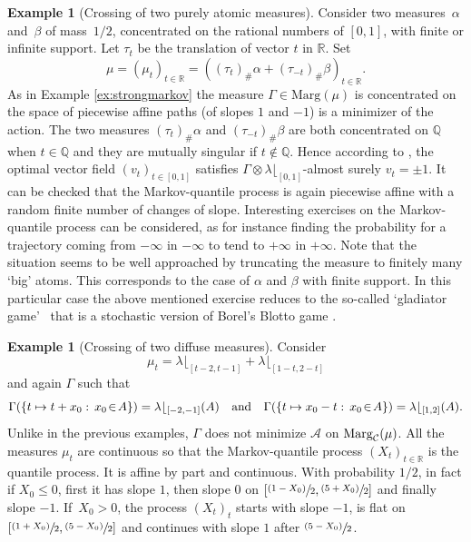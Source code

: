 \documentclass[11pt]{article}
\newcommand\mto{\mathchoice{\longmapsto}{\mapsto}{\mapsto}{\mapsto}}
\newcommand{\psfrac}[2]{\sfrac{(#1)}{#2}}
\theoremstyle{plain}
\theoremstyle{definition}
\newtheorem{ex}[them]{Example}
\newcommand{\A}{{\mathcal A}}
\newcommand{\la}{\lambda}
\newcommand{\ma}{\mathrm{Marg}}
\newcommand{\R}{\mathbb{R}}
\newcommand{\Q}{\mathbb{Q}}
\newcommand{\AND}{\quad\text{and}\quad}
\begin{document}
\begin{ex}[Crossing of two purely atomic measures]\label{ex:rationnal}
Consider two measures~$\alpha$ and~$\beta$ of mass~$1/2$, concentrated on the rational numbers of $[0,1]$, with finite or infinite support. Let $\tau_t$ be the translation of vector $t$ in $\R$. Set
\[
\mu=(\mu_t)_{t\in\R}=((\tau_t)_\#\alpha+(\tau_{-t})_\#\beta)_{t\in\R}.
\]
As in Example \ref{ex:strongmarkov} the measure $\Gamma\in \ma(\mu)$ is concentrated on the space of piecewise affine paths (of slopes $1$ and $-1$) is a minimizer of the action. The two measures $(\tau_t)_\#\alpha$ and $(\tau_{-t})_\#\beta$ are both concentrated on $\Q$ when $t\in \Q$ and they are mutually singular if $t\notin \Q$. Hence according to \cite{BouJui2}, the optimal vector field $(v_t)_{t\in [0,1]}$ satisfies $\Gamma\otimes \lambda\lfloor_{[0,1]}$-almost surely $v_t=\pm 1$. It can be checked that the Markov-quantile process is again piecewise affine with a random finite number of changes of slope. Interesting exercises on the Markov-quantile process can be considered, as for instance finding the probability for a trajectory coming from $-\infty$ in $-\infty$ to tend to $+\infty$ in $+\infty$. Note that the situation seems to be well approached by truncating the measure to finitely many `big' atoms. This corresponds to the case of $\alpha$ and $\beta$ with finite support. In this particular case the above mentioned exercise reduces to the so-called `gladiator game'~\cite{KLN} that is a stochastic version of Borel's Blotto game \cite{RSY}.
\end{ex}

\begin{ex}[Crossing of two diffuse measures]\label{ex:continuous}Consider
\[
\mu_t=\la\lfloor_{[t-2,t-1]}+\la\lfloor_{[1-t,2-t]}
\]
and again $\Gamma$ such that
\[\textstyle
\Gamma(\{t\mto t+x_0:\,x_0\!\in\!A\})=\la\lfloor_{[-2,-1]}(A)\AND \Gamma(\{t\mto x_0-t:\,x_0\!\in\! A\})=\la\lfloor_{[1,2]}(A).
\]
Unlike in the previous examples, $\Gamma$ does not minimize $\A$ on $\ma_\C(\mu)$. All the measures $\mu_t$ are continuous so that the Markov-quantile process $(X_t)_{t\in \R}$ is the quantile process. It is affine by part and continuous. With probability $1/2$, in fact if $X_0\leq 0$, first it has slope $1$, then slope $0$ on $[\psfrac{1-X_0}{2},\psfrac{5+X_0}{2}]$ and finally slope $-1$. If~$X_0>0$, the process $(X_t)_{t}$ starts with slope $-1$, is flat on $[\psfrac{1+X_0}{2},\psfrac{5-X_0}{2}]$ and continues with slope $1$ after $\psfrac{5-X_0}{2}$.
\end{ex}
\end{document}

